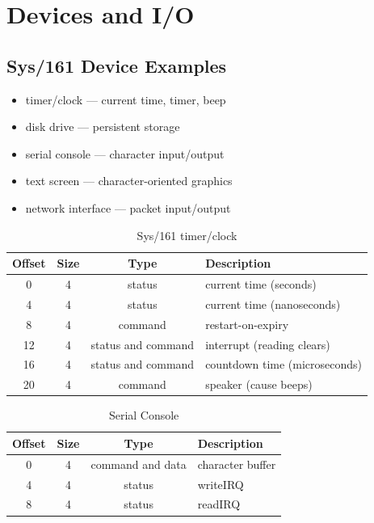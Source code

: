 \documentclass[12pt]{article}
\theoremstyle{plain}
\theoremstyle{definition}
\begin{document}
\newpage
\section{Devices and I/O}
\subsection{Sys/161 Device Examples}
\begin{itemize}
  \item timer/clock --- current time, timer, beep
  \item disk drive --- persistent storage
  \item serial console --- character input/output
  \item text screen --- character-oriented graphics
  \item network interface --- packet input/output
\end{itemize}

\begin{table}[H]
  \vspace{-20pt}
  \caption{Sys/161 timer/clock}
  \label{tab:sys161_timer}
  \centering

  \begin{tabular}{|c|c|c|l|}
  \hline
  Offset & Size & Type & Description \\ \hline \hline
  0 & 4 & status & current time (seconds) \\ \hline
  4 & 4 & status & current time (nanoseconds) \\ \hline
  8 & 4 & command & restart-on-expiry \\ \hline
  12 & 4 & status and command & interrupt (reading clears) \\ \hline
  16 & 4 & status and command & countdown time (microseconds) \\ \hline
  20 & 4 & command & speaker (cause beeps) \\ \hline
  \end{tabular}
\end{table}

\begin{table}[H]
  \vspace{-20pt}
  \caption{Serial Console}
  \label{tab:serial_con}
  \centering

  \begin{tabular}{|c|c|c|l|}
  \hline
  Offset & Size & Type & Description \\ \hline \hline
  0 & 4 & command and data & character buffer \\ \hline
  4 & 4 & status & writeIRQ \\ \hline
  8 & 4 & status & readIRQ \\ \hline
  \end{tabular}
\end{table}
\end{document}
